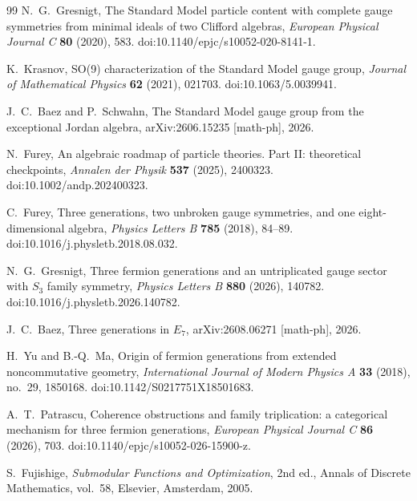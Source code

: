 \documentclass[11pt]{article}
\numberwithin{equation}{section}
\theoremstyle{definition}
\theoremstyle{remark}
\begin{document}
\begin{thebibliography}{99}
N.~G.~Gresnigt,
\newblock The Standard Model particle content with complete gauge symmetries from
minimal ideals of two Clifford algebras,
\newblock \emph{European Physical Journal C} \textbf{80} (2020), 583.
\newblock doi:10.1140/epjc/s10052-020-8141-1.

K.~Krasnov,
\newblock SO(9) characterization of the Standard Model gauge group,
\newblock \emph{Journal of Mathematical Physics} \textbf{62} (2021), 021703.
\newblock doi:10.1063/5.0039941.

J.~C.~Baez and P.~Schwahn,
\newblock The Standard Model gauge group from the exceptional Jordan algebra,
\newblock arXiv:2606.15235 [math-ph], 2026.

N.~Furey,
\newblock An algebraic roadmap of particle theories. Part II: theoretical checkpoints,
\newblock \emph{Annalen der Physik} \textbf{537} (2025), 2400323.
\newblock doi:10.1002/andp.202400323.

C.~Furey,
\newblock Three generations, two unbroken gauge symmetries, and one
eight-dimensional algebra,
\newblock \emph{Physics Letters B} \textbf{785} (2018), 84--89.
\newblock doi:10.1016/j.physletb.2018.08.032.

N.~G.~Gresnigt,
\newblock Three fermion generations and an untriplicated gauge sector with
$S_3$ family symmetry,
\newblock \emph{Physics Letters B} \textbf{880} (2026), 140782.
\newblock doi:10.1016/j.physletb.2026.140782.

J.~C.~Baez,
\newblock Three generations in $E_7$,
\newblock arXiv:2608.06271 [math-ph], 2026.

H.~Yu and B.-Q.~Ma,
\newblock Origin of fermion generations from extended noncommutative geometry,
\newblock \emph{International Journal of Modern Physics A} \textbf{33} (2018),
no.~29, 1850168.
\newblock doi:10.1142/S0217751X18501683.

A.~T.~Patrascu,
\newblock Coherence obstructions and family triplication: a categorical mechanism
for three fermion generations,
\newblock \emph{European Physical Journal C} \textbf{86} (2026), 703.
\newblock doi:10.1140/epjc/s10052-026-15900-z.

S.~Fujishige,
\newblock \emph{Submodular Functions and Optimization},
\newblock 2nd ed., Annals of Discrete Mathematics, vol.~58, Elsevier, Amsterdam,
2005.


\end{thebibliography}
\end{document}
